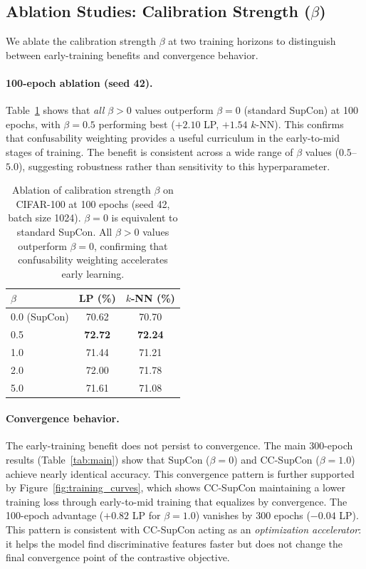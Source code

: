 \documentclass{article}
\begin{document}
\subsection{Ablation Studies: Calibration Strength ($\beta$)}
\label{sec:ablation}

We ablate the calibration strength $\beta$ at two training horizons to distinguish between early-training benefits and convergence behavior.

\paragraph{100-epoch ablation (seed 42).} Table~\ref{tab:ablation_100} shows that \emph{all} $\beta > 0$ values outperform $\beta = 0$ (standard SupCon) at 100 epochs, with $\beta = 0.5$ performing best ($+2.10$ LP, $+1.54$ $k$-NN). This confirms that confusability weighting provides a useful curriculum in the early-to-mid stages of training. The benefit is consistent across a wide range of $\beta$ values ($0.5$--$5.0$), suggesting robustness rather than sensitivity to this hyperparameter.

\begin{table}[t]
\caption{Ablation of calibration strength $\beta$ on CIFAR-100 at 100 epochs (seed 42, batch size 1024). $\beta = 0$ is equivalent to standard SupCon. All $\beta > 0$ values outperform $\beta = 0$, confirming that confusability weighting accelerates early learning.}
\label{tab:ablation_100}
\centering
\begin{tabular}{lcc}
\toprule
$\beta$ & LP (\%) & $k$-NN (\%) \\
\midrule
0.0 (SupCon) & 70.62 & 70.70 \\
0.5 & \textbf{72.72} & \textbf{72.24} \\
1.0 & 71.44 & 71.21 \\
2.0 & 72.00 & 71.78 \\
5.0 & 71.61 & 71.08 \\
\bottomrule
\end{tabular}
\end{table}

\paragraph{Convergence behavior.} The early-training benefit does not persist to convergence. The main 300-epoch results (Table~\ref{tab:main}) show that SupCon ($\beta = 0$) and CC-SupCon ($\beta = 1.0$) achieve nearly identical accuracy. This convergence pattern is further supported by Figure~\ref{fig:training_curves}, which shows CC-SupCon maintaining a lower training loss through early-to-mid training that equalizes by convergence. The 100-epoch advantage ($+0.82$ LP for $\beta = 1.0$) vanishes by 300 epochs ($-0.04$ LP). This pattern is consistent with CC-SupCon acting as an \emph{optimization accelerator}: it helps the model find discriminative features faster but does not change the final convergence point of the contrastive objective.
\end{document}
